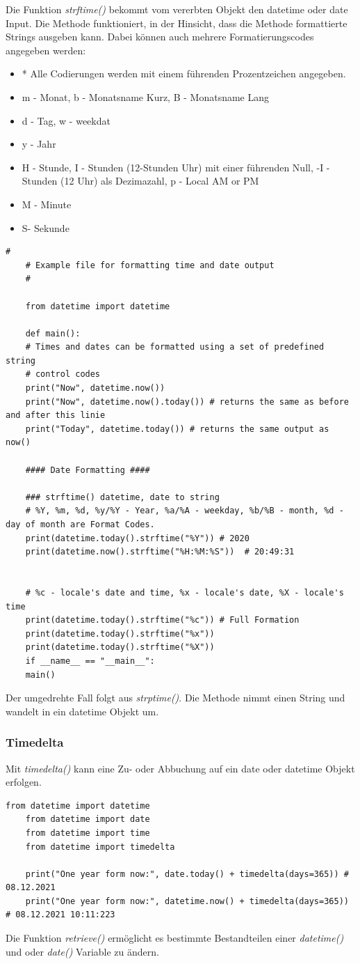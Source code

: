 Die Funktion \textit{strftime()} bekommt vom vererbten Objekt den datetime oder date Input. Die Methode funktioniert, in der Hinsicht, dass die Methode formattierte Strings ausgeben kann. Dabei können auch mehrere Formatierungscodes angegeben werden: 
\begin{itemize}
	\item * Alle Codierungen werden mit einem führenden Prozentzeichen angegeben.
	\item m - Monat, b - Monatsname Kurz, B - Monatsname Lang
	\item d - Tag, w - weekdat
	\item y - Jahr
	\item H - Stunde, I - Stunden (12-Stunden Uhr) mit einer führenden Null, -I - Stunden (12 Uhr) als Dezimazahl, p - Local AM or PM
	\item M - Minute
	\item S- Sekunde
\end{itemize}
\begin{lstlisting}[style=python]
	#
	# Example file for formatting time and date output
	#
	
	from datetime import datetime
	
	def main():
	# Times and dates can be formatted using a set of predefined string
	# control codes 
	print("Now", datetime.now()) 
	print("Now", datetime.now().today()) # returns the same as before and after this linie
	print("Today", datetime.today()) # returns the same output as now()
	
	#### Date Formatting ####
	
	### strftime() datetime, date to string
	# %Y, %m, %d, %y/%Y - Year, %a/%A - weekday, %b/%B - month, %d - day of month are Format Codes.
	print(datetime.today().strftime("%Y")) # 2020
	print(datetime.now().strftime("%H:%M:%S"))  # 20:49:31
	
	
	# %c - locale's date and time, %x - locale's date, %X - locale's time
	print(datetime.today().strftime("%c")) # Full Formation
	print(datetime.today().strftime("%x"))
	print(datetime.today().strftime("%X"))
	if __name__ == "__main__":
	main()
\end{lstlisting}
Der umgedrehte Fall folgt aus \textit{strptime()}. Die Methode nimmt einen String und wandelt in ein datetime Objekt um.
\subsubsection{Timedelta}
Mit \textit{timedelta()} kann eine Zu- oder Abbuchung auf ein date oder datetime Objekt erfolgen.
\begin{lstlisting}[style=python]
	from datetime import datetime
	from datetime import date
	from datetime import time
	from datetime import timedelta
	
	print("One year form now:", date.today() + timedelta(days=365)) # 08.12.2021
	print("One year form now:", datetime.now() + timedelta(days=365)) # 08.12.2021 10:11:223
\end{lstlisting}
Die Funktion \textit{retrieve()} ermöglicht es bestimmte Bestandteilen einer \textit{datetime()} und oder \textit{date()} Variable zu ändern.

